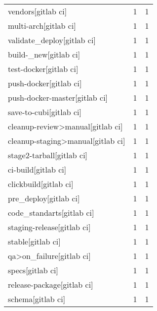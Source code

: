 \begin{tabular}{lrr}
vendors[gitlab ci]                         &                   1 &             1 \\
multi-arch[gitlab ci]                      &                   1 &             1 \\
validate\_deploy[gitlab ci]                 &                   1 &             1 \\
build-\_new[gitlab ci]                      &                   1 &             1 \\
test-docker[gitlab ci]                     &                   1 &             1 \\
push-docker[gitlab ci]                     &                   1 &             1 \\
push-docker-master[gitlab ci]              &                   1 &             1 \\
save-to-cubi[gitlab ci]                    &                   1 &             1 \\
cleanup-review>manual[gitlab ci]           &                   1 &             1 \\
cleanup-staging>manual[gitlab ci]          &                   1 &             1 \\
stage2-tarball[gitlab ci]                  &                   1 &             1 \\
ci-build[gitlab ci]                        &                   1 &             1 \\
clickbuild[gitlab ci]                      &                   1 &             1 \\
pre\_deploy[gitlab ci]                      &                   1 &             1 \\
code\_standarts[gitlab ci]                  &                   1 &             1 \\
staging-release[gitlab ci]                 &                   1 &             1 \\
stable[gitlab ci]                          &                   1 &             1 \\
qa>on\_failure[gitlab ci]                   &                   1 &             1 \\
specs[gitlab ci]                           &                   1 &             1 \\
release-package[gitlab ci]                 &                   1 &             1 \\
schema[gitlab ci]                          &                   1 &             1 \\

\end{tabular}
